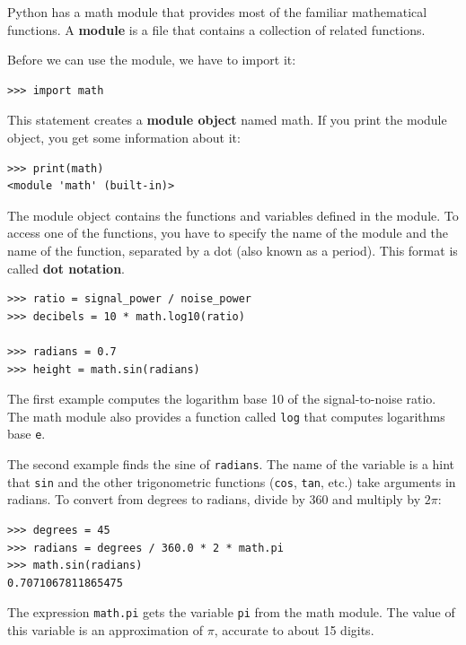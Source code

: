 \documentclass[10pt]{book}
\begin{document}
Python has a math module that provides most of the familiar
mathematical functions.  A {\bf module} is a file that contains a
collection of related functions.


Before we can use the module, we have to import it:

\beforeverb
\begin{verbatim}
>>> import math
\end{verbatim}
\afterverb
%
This statement creates a {\bf module object} named math.  If
you print the module object, you get some information about it:

\beforeverb
\begin{verbatim}
>>> print(math)
<module 'math' (built-in)>
\end{verbatim}
\afterverb
%
The module object contains the functions and variables defined in the
module.  To access one of the functions, you have to specify the name
of the module and the name of the function, separated by a dot (also
known as a period).  This format is called {\bf dot notation}.


\beforeverb
\begin{verbatim}
>>> ratio = signal_power / noise_power
>>> decibels = 10 * math.log10(ratio)

>>> radians = 0.7
>>> height = math.sin(radians)
\end{verbatim}
\afterverb
%
The first example computes the logarithm base 10 of the
signal-to-noise ratio.  The math module also provides a
function called {\tt log} that computes logarithms base {\tt e}.


The second example finds the sine of {\tt radians}.  The name of the
variable is a hint that {\tt sin} and the other trigonometric
functions ({\tt cos}, {\tt tan}, etc.)  take arguments in radians. To
convert from degrees to radians, divide by 360 and multiply by $2
\pi$:

\beforeverb
\begin{verbatim}
>>> degrees = 45
>>> radians = degrees / 360.0 * 2 * math.pi
>>> math.sin(radians)
0.7071067811865475
\end{verbatim}
\afterverb
%
The expression {\tt math.pi} gets the variable {\tt pi} from the math
module.  The value of this variable is an approximation
of $\pi$, accurate to about 15 digits.
\end{document}
